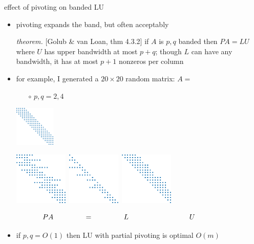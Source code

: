 \documentclass[10pt,
               svgnames,
               hyperref={colorlinks,citecolor=DeepPink4,linkcolor=FireBrick,urlcolor=Maroon},
               usepdftitle=false]{beamer}
\begin{document}
\begin{frame}{effect of pivoting on banded LU}

\begin{itemize}
\item pivoting expands the band, but often acceptably

\bigskip
\emph{theorem.} {\scriptsize [Golub \& van Loan, thm 4.3.2]} if $A$ is $p,q$ banded then $PA=LU$ where $U$ has upper bandwidth at most $p+q$; though $L$ can have any bandwidth, it has at most $p+1$ nonzeros per column

\bigskip
\item for example, I generated a $20\times 20$ random matrix: \qquad $A=$
   \begin{itemize}
   \item[$\circ$] $p,q=2,4$
   \end{itemize}

\vspace{-12mm}
\hfill \includegraphics[width=0.15\textwidth]{images/banded-A.png}

\vspace{-3mm}
\mbox{\includegraphics[width=0.2\textwidth]{images/banded-PA.png} \qquad \qquad \includegraphics[width=0.2\textwidth]{images/banded-L.png} \includegraphics[width=0.2\textwidth]{images/banded-U.png}}

\vspace{-3mm}
$$PA \hspace{15mm} = \hspace{15mm} L \hspace{30mm} U \hspace{20mm}$$

\medskip
\item if $p,q=O(1)$ then LU with partial pivoting is optimal $O(m)$
\end{itemize}
\end{frame}
\end{document}
